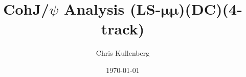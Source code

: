 \title{CohJ/$\psi$ Analysis (\textbf{LS}-$\boldsymbol{\mu\mu}$)(\textbf{DC})(\textbf{4-track})}
\author{Chris Kullenberg}
\date{\today}

